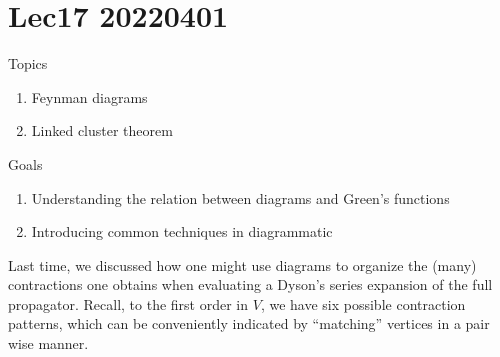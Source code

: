 \chapter{Lec17 20220401}

Topics

\begin{enumerate}
    \item Feynman diagrams
    \item Linked cluster theorem
\end{enumerate}

Goals

\begin{enumerate}
    \item Understanding the relation between diagrams and Green's functions
    \item Introducing common techniques in diagrammatic
\end{enumerate}

Last time, we discussed how one might use diagrams to organize the (many) contractions one obtains when evaluating a Dyson's series expansion of the full propagator. Recall, to the first order in $V$, we have six possible contraction patterns, which can be conveniently indicated by ``matching'' vertices in a pair wise manner.

